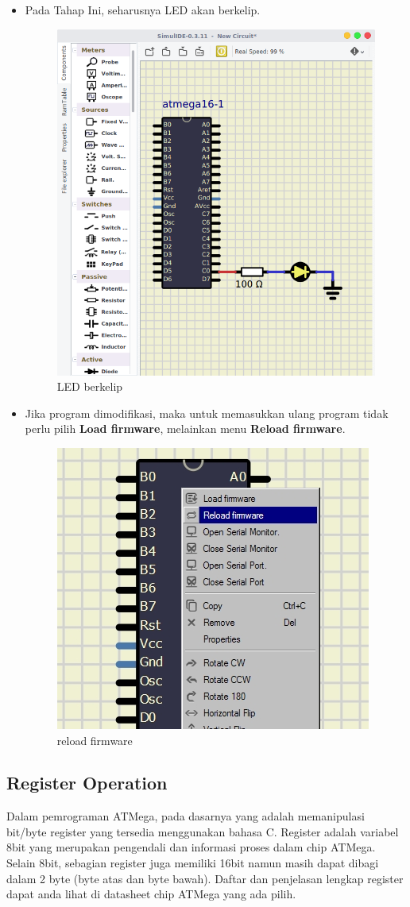 \documentclass[12pt,]{article}
\begin{document}
\begin{itemize}
		\item Pada Tahap Ini, seharusnya LED akan berkelip.
		
		\begin{figure}[H]
			\centering
			\includegraphics[width=0.5\linewidth]{images/tessim_4}
			\caption{LED berkelip}
		\end{figure}
		
		\item Jika program dimodifikasi, maka untuk memasukkan ulang program tidak perlu pilih \textbf{Load firmware},
		melainkan menu \textbf{Reload firmware}.
		
		\begin{figure}[H]
			\centering
			\includegraphics[width=0.5\linewidth]{images/tessim_5}
			\caption{reload firmware}
		\end{figure}
	\end{itemize}

	\newpage
	\subsection{Register Operation}
	
	Dalam pemrograman ATMega, pada dasarnya yang adalah memanipulasi bit/byte register yang tersedia menggunakan bahasa C.
	Register adalah variabel 8bit yang merupakan pengendali dan informasi proses dalam chip ATMega.
	Selain 8bit, sebagian register juga memiliki 16bit namun masih dapat dibagi dalam 2 byte (byte atas dan byte bawah).
	Daftar dan penjelasan lengkap register dapat anda lihat di datasheet chip ATMega yang ada pilih.
	
\end{document}
